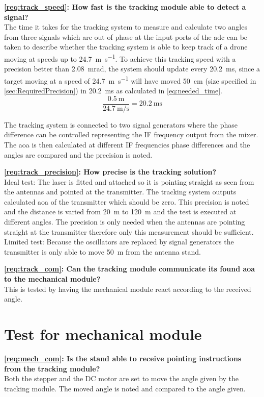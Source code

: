 \textbf{\autoref{req:track_speed}: How fast is the tracking module able to detect a signal?}\\
The time it takes for the tracking system to measure and calculate two angles from three signals which are out of phase at the input ports of the \gls{adc} can be taken to describe whether the tracking system is able to keep track of a drone moving at speeds up to \SI{24.7}{\meter\per\second}. To achieve this tracking speed with a precision better than \SI{2,08}{\milli\radian}, the system should update every \SI{20.2}{\milli\second}, since a target moving at a speed of \SI{24.7}{\meter\per\second} will have moved \SI{50}{\centi\meter} (size specified in \autoref{sec:RequiredPrecision}) in \SI{20.2}{\milli\second} as calculated in \autoref{eq:needed_time}.
\begin{equation} \label{eq:needed_time}
\frac{\SI{0.5}{\meter}}{\SI{24.7}{\meter\per\second}} = \SI{20.2}{\milli\second}
\end{equation}

The tracking system is connected to two signal generators where the phase difference can be controlled representing the IF frequency output from the mixer. The \gls{aoa} is then calculated at different IF frequencies phase differences and the angles are compared and the precision is noted.


\textbf{\autoref{req:track_precision}: How precise is the tracking solution?}\\
Ideal test:
The laser is fitted and attached so it is pointing straight as seen from the antennas and pointed at the transmitter. The tracking system outputs calculated \gls{aoa} of the transmitter which should be zero. This precision is noted and the distance is varied from \SI{20}{\meter} to \SI{120}{\meter} and the test is executed at different angles. The precision is only needed when the antennas are pointing straight at the transmitter therefore only this measurement should be sufficient. \\
Limited test: Because the oscillators are replaced by signal generators the transmitter is only able to move \SI{50}{\meter} from the antenna stand.


\textbf{\autoref{req:track_com}: Can the tracking module communicate its found \gls{aoa} to the mechanical module?} \\
This is tested by having the mechanical module react according to the received angle.

\newpage
\section{Test for mechanical module}
\textbf{\autoref{req:mech_com}: Is the stand able to receive pointing instructions from the tracking module?}\\
Both the stepper and the DC motor are set to move the angle given by the tracking module. The moved angle is noted and compared to the angle given.

